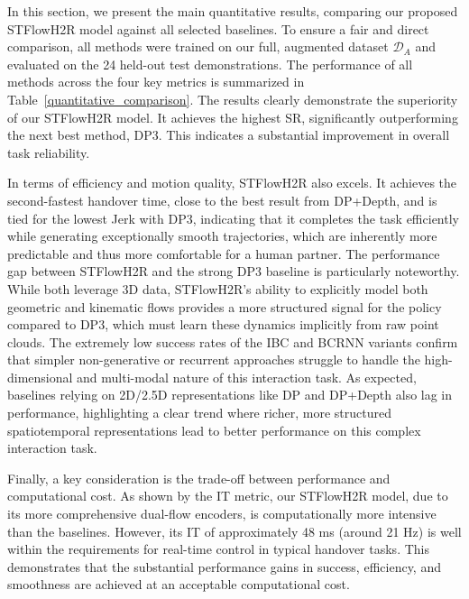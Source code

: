 \documentclass[final,5p,times,twocolumn]{elsarticle}
\begin{document}
In this section, we present the main quantitative results, comparing our proposed STFlowH2R model against all selected baselines. To ensure a fair and direct comparison, all methods were trained on our full, augmented dataset $\mathcal{D}_A$ and evaluated on the 24 held-out test demonstrations. The performance of all methods across the four key metrics is summarized in Table~\ref{quantitative_comparison}. The results clearly demonstrate the superiority of our STFlowH2R model. It achieves the highest SR, significantly outperforming the next best method, DP3. This indicates a substantial improvement in overall task reliability.


In terms of efficiency and motion quality, STFlowH2R also excels. It achieves the second-fastest handover time, close to the best result from DP+Depth, and is tied for the lowest Jerk with DP3, indicating that it completes the task efficiently while generating exceptionally smooth trajectories, which are inherently more predictable and thus more comfortable for a human partner. The performance gap between STFlowH2R and the strong DP3 baseline is particularly noteworthy. While both leverage 3D data, STFlowH2R's ability to explicitly model both geometric and kinematic flows provides a more structured signal for the policy compared to DP3, which must learn these dynamics implicitly from raw point clouds. The extremely low success rates of the IBC and BCRNN variants confirm that simpler non-generative or recurrent approaches struggle to handle the high-dimensional and multi-modal nature of this interaction task. As expected, baselines relying on 2D/2.5D representations like DP and DP+Depth also lag in performance, highlighting a clear trend where richer, more structured spatiotemporal representations lead to better performance on this complex interaction task.


Finally, a key consideration is the trade-off between performance and computational cost. As shown by the IT metric, our STFlowH2R model, due to its more comprehensive dual-flow encoders, is computationally more intensive than the baselines. However, its IT of approximately 48 ms (around 21 Hz) is well within the requirements for real-time control in typical handover tasks. This demonstrates that the substantial performance gains in success, efficiency, and smoothness are achieved at an acceptable computational cost.
\end{document}
